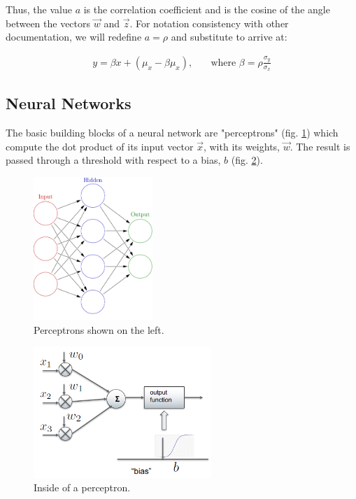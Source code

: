 \documentclass[11pt,a4paper]{article}
\begin{document}
Thus, the value $a$ is the correlation coefficient and is the cosine of the angle between the vectors $\vec{w}$ and $\vec{z}$. For notation consistency with other documentation, we will redefine $a= \rho$ and substitute to arrive at:

\begin{align*}
y = \beta x + (\mu_x - \beta \mu_x), \quad	&\text{where $\beta = \rho \frac{\sigma_y}{\sigma_x}$}
\end{align*}

\subsection{Neural Networks}
The basic building blocks of a neural network are "perceptrons" (fig. \ref{fig:nn}) which compute the dot product of its input vector $\vec{x}$, with its weights, $\vec{w}$. The result is passed through a threshold with respect to a bias, $b$ (fig. \ref{fig:nn1}).

\begin{figure}[ht]
\centering
\includegraphics[width=0.4\textwidth]{nn}
\caption{Perceptrons shown on the left.}
\label{fig:nn}
\end{figure}

\begin{figure}[ht]
\centering
\includegraphics[width=0.6\textwidth]{nn1}
\caption{Inside of a perceptron.}
\label{fig:nn1}
\end{figure}
\end{document}
